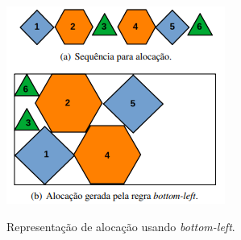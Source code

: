 \begin{figure}[H]
    \centering
    \caption{Representação de alocação usando \textit{bottom-left}.}
    \includegraphics{utils/images/bottom-left}
    \label{fig:bottom-left}
\end{figure}
